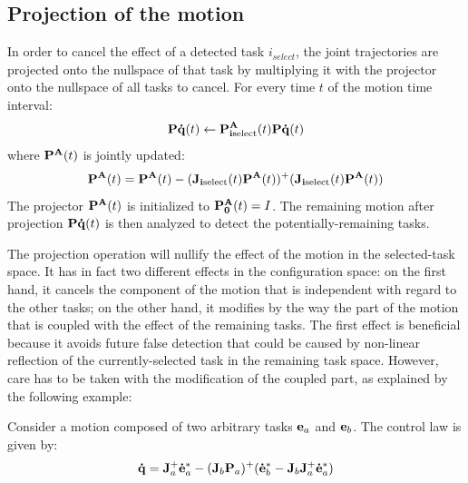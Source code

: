 \documentclass[letterpaper, 10pt, conference]{ieeeconf}      %
\begin{document}
\subsection{Projection of the motion}
In order to cancel the effect of a detected task $i_{select}$, the joint trajectories are projected onto the nullspace
of that task by multiplying it with the projector onto the nullspace of all tasks to cancel.
For every time $t$ of the motion time interval:
\begin{equation}
  {\mathbf{P\dot{q}}}(t) \leftarrow {\mathbf{P^A_{i\mathrm{select}}}}(t) {\mathbf{P\dot{q}}}(t) 
  \label{eq:projection}
\end{equation}
where $ {\mathbf{P^A}}(t)$ is jointly updated:
\begin{equation*}
  {\mathbf{P^A}}(t) = {\mathbf{P^A}}(t) - ({\mathbf{J_{i\mathrm{select}}}}(t){\mathbf{P^A}}(t))^+({\mathbf{J_{i\mathrm{select}}}}(t){\mathbf{P^A}}(t))
  \label{eq:projectionupdate}
\end{equation*}
The projector ${\mathbf{P^A}}(t)$ is initialized to ${\mathbf{P^A_0}}(t) = I$. The
remaining motion after projection ${\mathbf{P\dot{q}}}(t) $ is then analyzed to
detect the potentially-remaining tasks.

The projection operation will nullify the effect of the motion in the
selected-task space. It has in fact two different effects in the configuration
space: on the first hand, it cancels the component of the motion that is
independent with regard to the other tasks; on the other hand, it modifies by
the way the part of the motion that is coupled with the effect of the remaining
tasks. The first effect is beneficial because it avoids future false
detection that could be caused by non-linear reflection of the
currently-selected task in the remaining task space. However, care has to be taken with the modification of the coupled part, as explained by the following example:

Consider a motion composed of two arbitrary tasks ${\mathbf{e}}_a$ and ${\mathbf{e}}_b$.
The control law is given by:
\begin{equation}
  {\mathbf{\dot{q}}} = {\mathbf{J}}_a^+{\mathbf{\dot{e}}}_a^* - ({\mathbf{J}}_b{\mathbf{P}}_a)^+ ({\mathbf{\dot{e}}}_b^* - {\mathbf{J}}_b{\mathbf{J}}_a^+{\mathbf{\dot{e}}}_a^*)
  \label{eq:controlLaw2Tasks}
\end{equation}
\end{document}
